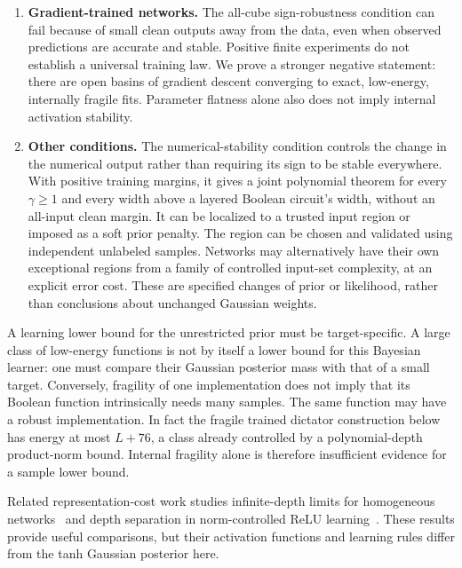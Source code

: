 \documentclass[11pt]{article}
\begin{document}
\begin{enumerate}
rate at most a universal constant. Thus an absolute-rate counting argument
fails even at a fixed rate threshold.
These results do not compare competing functions with a simple target and
are not sample lower bounds.
\item \textbf{Gradient-trained networks.}
The all-cube sign-robustness condition can fail because of small clean outputs
away from the data, even when observed predictions are accurate and stable.
Positive finite experiments do not establish a universal training law.
We prove a stronger negative statement: there are open basins of gradient
descent converging to exact, low-energy, internally fragile fits.
Parameter flatness alone also does not imply internal activation stability.
\item \textbf{Other conditions.}
The numerical-stability condition controls the change in the numerical output
rather than requiring its sign to be stable everywhere. With positive
training margins, it gives a joint polynomial theorem for every
$\gamma\ge1$ and every width above a layered Boolean circuit's width,
without an all-input clean margin. It can be localized to a trusted input
region or imposed as a soft prior penalty. The region can be chosen and
validated using independent unlabeled samples. Networks may alternatively
have their own exceptional regions from a family of controlled input-set
complexity, at an explicit error cost. These are specified changes of
prior or likelihood, rather than conclusions about unchanged Gaussian
weights.
\end{enumerate}

A learning lower bound for the unrestricted prior must be target-specific. A large class
of low-energy functions is not by itself a lower bound for this Bayesian
learner: one must compare their Gaussian posterior mass with that of a
small target. Conversely, fragility of one implementation does not imply
that its Boolean function intrinsically needs many samples. The same
function may have a robust implementation. In fact the fragile trained
dictator construction below has energy at most $L+76$, a class already
controlled by a polynomial-depth product-norm bound. Internal fragility
alone is therefore insufficient evidence for a sample lower bound.

Related representation-cost work studies infinite-depth limits for
homogeneous networks~\cite{jacot2023} and depth separation in
norm-controlled ReLU learning~\cite{parkinson2024}. These results provide
useful comparisons, but their activation functions and learning rules
differ from the tanh Gaussian posterior here.
\end{document}
